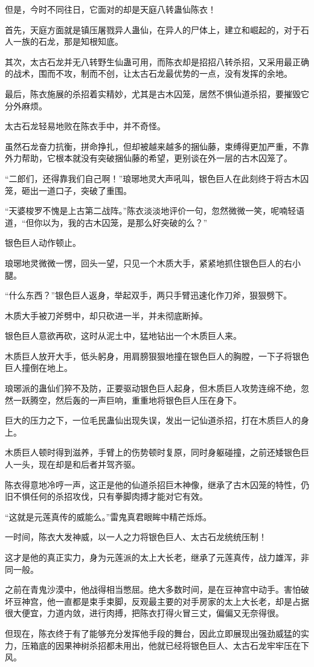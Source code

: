 \begin{this_body}
但是，今时不同往日，它面对的却是天庭八转蛊仙陈衣！

首先，天庭方面就是镇压屠戮异人蛊仙，在异人的尸体上，建立和崛起的，对于石人一族的石龙，那是知根知底。

其次，太古石龙并无八转野生仙蛊可用，而陈衣却是招招八转杀招，又采用最正确的战术，围而不攻，制而不创，让太古石龙最优势的一点，没有发挥的余地。

最后，陈衣施展的杀招着实精妙，尤其是古木囚笼，居然不惧仙道杀招，要摧毁它分外麻烦。

太古石龙轻易地败在陈衣手中，并不奇怪。

虽然石龙奋力抗衡，拼命挣扎，但却被越来越多的捆仙藤，束缚得更加严重，不靠外力帮助，它根本就没有突破捆仙藤的希望，更别谈在外一层的古木囚笼了。

“二郎们，还得靠我们自己啊！”琅琊地灵大声吼叫，银色巨人在此刻终于将古木囚笼，砸出一道口子，突破了重围。

“天婆梭罗不愧是上古第二战阵。”陈衣淡淡地评价一句，忽然微微一笑，呢喃轻语道，“但你以为，我的古木囚笼，是那么好突破的么？”

银色巨人动作顿止。

琅琊地灵微微一愣，回头一望，只见一个木质大手，紧紧地抓住银色巨人的右小腿。

“什么东西？”银色巨人返身，举起双手，两只手臂迅速化作刀斧，狠狠劈下。

木质大手被刀斧劈中，却只砍进一半，并未彻底断掉。

银色巨人意欲再砍，这时从泥土中，猛地钻出一个木质巨人来。

木质巨人放开大手，低头躬身，用肩膀狠狠地撞在银色巨人的胸膛，一下子将银色巨人撞倒在地上。

琅琊派的蛊仙们猝不及防，正要驱动银色巨人起身，但木质巨人攻势连绵不绝，忽然一跃腾空，然后轰的一声巨响，重重地将银色巨人压在身下。

巨大的压力之下，一位毛民蛊仙出现失误，发出一记仙道杀招，打在木质巨人的身上。

木质巨人顿时得到滋养，手臂上的伤势顿时复原，同时身躯碰撞，之前还矮银色巨人一头，现在却是和后者并驾齐驱。

陈衣得意地冷哼一声，这正是他的仙道杀招巨木神像，继承了古木囚笼的特性，仍旧不惧任何的杀招攻伐，只有拳脚肉搏才能对它有效。

“这就是元莲真传的威能么。”雷鬼真君眼眸中精芒烁烁。

一时间，陈衣大发神威，以一人之力将银色巨人、太古石龙统统压制！

这才是他的真正实力，身为元莲派的太上大长老，继承了元莲真传，战力雄浑，非同一般。

之前在青鬼沙漠中，他战得相当憋屈。绝大多数时间，是在豆神宫中动手。害怕破坏豆神宫，他一直都是束手束脚，反观最主要的对手房家的太上大长老，却是占据很大便宜，力道内敛，进行肉搏，把陈衣打得火冒三丈，偏偏又无奈得很。

但现在，陈衣终于有了能够充分发挥他手段的舞台，因此立即展现出强劲威猛的实力，压箱底的因果神树杀招都未用出，他就已经将银色巨人、太古石龙牢牢压在下风。

\end{this_body}

